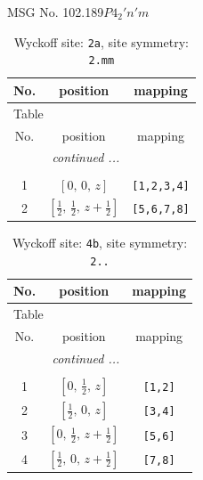\documentclass[fleqn,8pt]{jsarticle}
\begin{document}
\setcounter{MaxMatrixCols}{32}

\renewcommand{\tablename}{Table~}
\renewcommand{\figurename}{Figure~}
\begin{center}
\LARGE
MSG No. 102.189\quad$P4_{2}'n'm$
\end{center}
\renewcommand{\arraystretch}{1.2}
\begin{longtable}{ccc}
\caption{Wyckoff site: {\tt 2a}, site symmetry: {\tt 2.mm}}
 \\
 \hline \hline
No. & position & mapping \\ \hline \endfirsthead

\multicolumn{2}{l}{\tablename\ \thetable{}} \\
 \hline \hline
No. & position & mapping \\ \hline \endhead

 \hline \hline
\multicolumn{2}{r}{\footnotesize\it continued ...} \\ \endfoot

 \hline \hline
\multicolumn{2}{r}{} \\ \endlastfoot

1 & $\left[ 0,\, 0,\, z \right]$ & {\tt [1,2,3,4]} \\ \hline
2 & $\left[ \frac{1}{2},\, \frac{1}{2},\, z + \frac{1}{2} \right]$ & {\tt [5,6,7,8]} \\
\end{longtable}
\renewcommand{\arraystretch}{1.2}
\begin{longtable}{ccc}
\caption{Wyckoff site: {\tt 4b}, site symmetry: {\tt 2..}}
 \\
 \hline \hline
No. & position & mapping \\ \hline \endfirsthead

\multicolumn{2}{l}{\tablename\ \thetable{}} \\
 \hline \hline
No. & position & mapping \\ \hline \endhead

 \hline \hline
\multicolumn{2}{r}{\footnotesize\it continued ...} \\ \endfoot

 \hline \hline
\multicolumn{2}{r}{} \\ \endlastfoot

1 & $\left[ 0,\, \frac{1}{2},\, z \right]$ & {\tt [1,2]} \\ \hline
2 & $\left[ \frac{1}{2},\, 0,\, z \right]$ & {\tt [3,4]} \\ \hline
3 & $\left[ 0,\, \frac{1}{2},\, z + \frac{1}{2} \right]$ & {\tt [5,6]} \\ \hline
4 & $\left[ \frac{1}{2},\, 0,\, z + \frac{1}{2} \right]$ & {\tt [7,8]} \\
\end{longtable}
\end{document}
